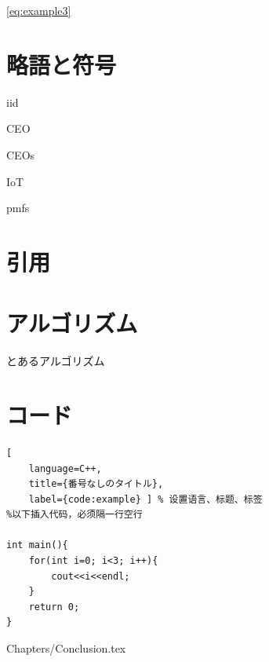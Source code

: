 \eqref{eq:example3}


\section{略語と符号}
\gls{iid}


\Gls{CEO}


\glspl{CEO}

\gls{IoT}


\Glspl{pmf}

\section{引用}
\cite{berger1978multiterminal}

\cite{berrou1996near,shannon1959coding,el2011network,mp3standard}

\cite{el2011network,berger1978multiterminal}

\cite{Tung1978multiterminal}

\section{アルゴリズム}
\begin{algorithm}
\caption{とあるアルゴリズム}
\label{alg:example}
\begin{algorithmic}

	\ENDFOR
\ELSE
	\ENDFOR 
\ENDIF
\end{algorithmic}
\end{algorithm}


\section{コード}
\begin{lstlisting}[
	language=C++,
	title={番号なしのタイトル},
	label={code:example} ] % 设置语言、标题、标签
%以下插入代码，必须隔一行空行

int main(){
	for(int i=0; i<3; i++){
		cout<<i<<endl;
	}
	return 0;
}
\end{lstlisting}


	{Chapters/Conclusion.tex} %


